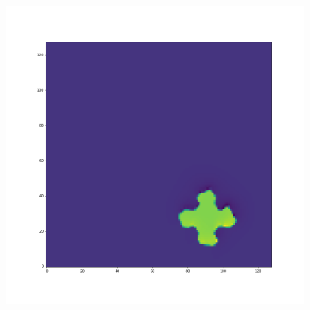 \documentclass[12pt,a4paper]{article}
\begin{document}
\begin{figure}[H]
\begin{minipage}{.3\textwidth}
\end{minipage}%
\begin{minipage}{.3\textwidth}
  \centering
  \includegraphics[width=\linewidth]{Pictures/PlusRotateTestJR/PlusRotateTest_t50.png}
\end{minipage}
\end{figure}
\end{document}
